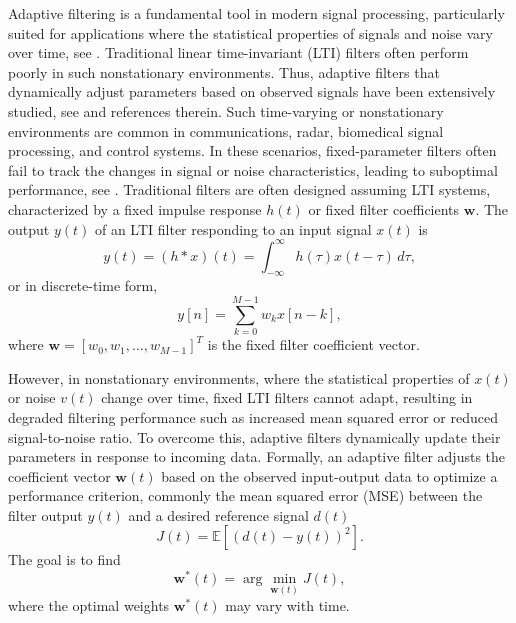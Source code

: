 \documentclass[reqno]{amsart}
\numberwithin{equation}{section}
\begin{document}
Adaptive filtering is a fundamental tool in modern signal processing, particularly suited for applications where the statistical properties of signals and noise vary over time, see \cite{ figueroa2004simplicial,Haykin2014,narendra2012stable}. Traditional linear time-invariant (LTI) filters often perform poorly in such nonstationary environments. Thus, adaptive filters that dynamically adjust parameters based on observed signals have been extensively studied, see \cite{Haykin2014} and references therein.  Such time-varying or  nonstationary environments  are common in communications, radar, biomedical signal processing, and control systems. In these scenarios, fixed-parameter filters often fail to track the changes in signal or noise characteristics, leading to suboptimal performance, see \cite{WidrowStearns1985}.
Traditional filters are often designed assuming  LTI systems, characterized by a fixed impulse response \( h(t) \) or fixed filter coefficients \(\mathbf{w}\). The output \( y(t) \) of an LTI filter responding to an input signal \( x(t) \) is
\begin{equation}
y(t) = (h * x)(t) = \int_{-\infty}^{\infty} h(\tau) x(t - \tau) \, d\tau,
\end{equation}
or in discrete-time form,
\begin{equation}
y[n] = \sum_{k=0}^{M-1} w_k x[n - k],
\end{equation}
where \(\mathbf{w} = [w_0, w_1, \ldots, w_{M-1}]^T\) is the fixed filter coefficient vector.

However, in  nonstationary environments, where the statistical properties of \( x(t) \) or noise \( v(t) \) change over time, fixed LTI filters cannot adapt, resulting in degraded filtering performance such as increased mean squared error or reduced signal-to-noise ratio. To overcome this,  adaptive filters dynamically update their parameters in response to incoming data. Formally, an adaptive filter adjusts the coefficient vector \(\mathbf{w}(t)\) based on the observed input-output data to optimize a performance criterion, commonly the  mean squared error  (MSE) between the filter output \( y(t) \) and a desired reference signal \( d(t) \)
\begin{equation}
J(t) = \mathbb{E} \left[ \left( d(t) - y(t) \right)^2 \right].
\end{equation}
The goal is to find
\begin{equation}
\mathbf{w}^*(t) = \arg \min_{\mathbf{w}(t)} J(t),
\end{equation}
where the optimal weights \(\mathbf{w}^*(t)\) may vary with time.
\end{document}
